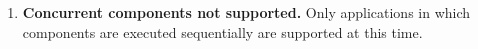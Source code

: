 %


\begin{enumerate}

\item {\bf Concurrent components not supported.}  Only applications in 
which components are executed sequentially are supported at this time. 

\end{enumerate}
